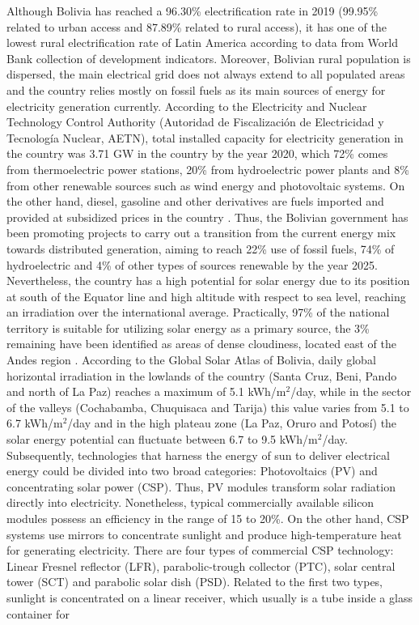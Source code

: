\documentclass{ECOS_2019}
\begin{document}
Although Bolivia has reached a 96.30\% electrification rate in 2019 (99.95\% related to urban access and 87.89\% related to rural access), it has one of the lowest rural electrification rate of Latin America according to data from World Bank collection of development indicators\cite{WorldBank2019}. Moreover, Bolivian rural population is dispersed, the main electrical grid does not always extend to all populated areas and the country relies mostly on fossil fuels as its main sources of energy for electricity generation currently\cite{Fernandez2020}. According to the Electricity and Nuclear Technology Control Authority (Autoridad de Fiscalización de Electricidad y Tecnología Nuclear, AETN), total installed capacity for electricity generation in the country was 3.71 GW in the country by the year 2020, which 72\% comes from thermoelectric power stations, 20\% from hydroelectric power plants and 8\% from other renewable sources such as wind energy and photovoltaic systems. On the other hand, diesel, gasoline and other derivatives are fuels imported and provided at subsidized prices in the country \cite{BIDBancoInteramericanodeDesarrollo2013}. Thus, the Bolivian government has been promoting projects to carry out a transition from the current energy mix towards distributed generation, aiming to reach 22\% use of fossil fuels, 74\% of hydroelectric and 4\% of other types of sources renewable by the year 2025\cite{AutoridaddeFiscalizaciondeElectricidadyTecnologiaNuclearAETN2020}. Nevertheless, the country has a high potential for solar energy due to its position at south of the Equator line and high altitude with respect to sea level, reaching an irradiation over the international average\cite{Fernandez2020}. Practically, 97\% of the national territory is suitable for utilizing solar energy as a primary source, the 3\% remaining have been identified as areas of dense cloudiness, located east of the Andes region \cite{Fernandez2012}. According to the Global Solar Atlas of Bolivia, daily global horizontal irradiation in the lowlands of the country (Santa Cruz, Beni, Pando and north of La Paz) reaches a maximum of 5.1 kWh/m$^2$/day, while in the sector of the valleys (Cochabamba, Chuquisaca and Tarija) this value varies from 5.1 to 6.7 kWh/m$^2$/day and in the high plateau zone (La Paz, Oruro and Potosí) the solar energy potential can fluctuate between 6.7 to 9.5 kWh/m$^2$/day\cite{Lucano2010}.\\ Subsequently, technologies that harness the energy of sun to deliver electrical energy could be divided into two broad categories: Photovoltaics (PV) and concentrating solar power (CSP). Thus, PV modules transform solar radiation directly into electricity. Nonetheless, typical commercially available silicon modules possess an efficiency in the range of 15 to 20\%\cite{Everett2021}. On the other hand, CSP systems use mirrors to concentrate sunlight and produce high-temperature heat for generating electricity. There are four types of commercial CSP technology: Linear Fresnel reflector (LFR), parabolic-trough collector (PTC), solar central tower (SCT) and parabolic solar dish (PSD)\cite{Fernandez2019}. Related to the first two types, sunlight is concentrated on a linear receiver, which usually is a tube inside a glass container for 
\end{document}
